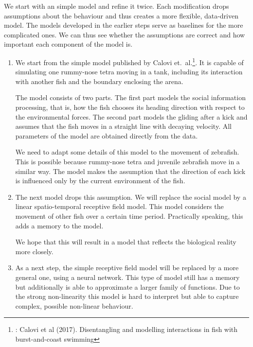 \documentclass[nobib]{tufte-handout}
\begin{document}
We start with an simple model and refine it twice.
Each modification drops assumptions about the behaviour and thus creates a more flexible, data-driven model.
The models developed in the earlier steps serve as baselines for the more complicated ones.
We can thus see whether the assumptions are correct and how important each component of the model is.
\begin{enumerate}
\item We start from the simple model published by Calovi et.\ al.\footnote{: Calovi et al (2017). Disentangling and modelling interactions in fish with burst-and-coast swimming}.
It is capable of simulating one rummy-nose tetra moving in a tank, including its interaction with another fish and the boundary enclosing the arena.

The model consists of two parts.
The first part models the social information processing, that is, how the fish chooses its heading direction with respect to the environmental forces.
The second part models the gliding after a kick and assumes that the fish moves in a straight line with decaying velocity.
All parameters of the model are obtained directly from the data.

We need to adapt some details of this model to the movement of zebrafish.
This is possible because rummy-nose tetra and juvenile zebrafish move in a similar way.
The model makes the assumption that the direction of each kick is influenced only by the current environment of the fish.
\item The next model drops this assumption.
We will replace the social model by a linear spatio-temporal receptive field model.
This model considers the movement of other fish over a certain time period.
Practically speaking, this adds a memory to the model.

We hope that this will result in a model that reflects the biological reality more closely.
\item As a next step, the simple receptive field model will be replaced by a more general one, using a neural network.
This type of model still has a memory but additionally is able to approximate a larger family of functions.
Due to the strong non-linearity this model is hard to interpret but able to capture complex, possible non-linear behaviour.
\end{enumerate}
\end{document}
